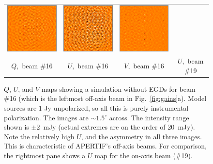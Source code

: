 \documentclass{aps2010} \special{papersize=8.5in,11in}
\begin{document}
\begin{figure}
\begin{tabular}{@{}cccc@{}}
\includegraphics[width=4cm]{q15} &
\includegraphics[width=4cm]{u15} &
\includegraphics[width=4cm]{v15} &\\
$Q,$ beam \#16 & $U,$ beam \#16 & $V,$ beam \#16 & $U,$ beam \#19
\end{tabular}
\caption{\label{fig:quv}$Q$, $U$, and $V$ maps showing a simulation without EGDs for beam \#16 (which is the leftmost off-axis beam in Fig.~\ref{fig:gains}a). Model sources are 1 Jy unpolarized, so all this is purely instrumental polarization. The images are $\sim1.5^\circ$ across. The intensity range shown is $\pm2$~mJy (actual extremes are on the order of 20~mJy). Note the relatively high $U$, and the asymmetry in all three images. This is characteristic of APERTIF's off-axis beams. For comparison, the rightmost pane shows a $U$ map for the on-axis beam (\#19).}
\end{figure}
\end{document}

